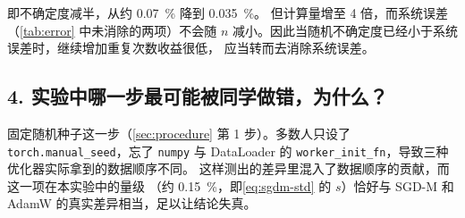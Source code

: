 即不确定度减半，从约 \qty{0.07}{\percent} 降到 \qty{0.035}{\percent}。
但计算量增至 4 倍，而系统误差（\cref{tab:error} 中未消除的两项）不会随
$n$ 减小。因此当随机不确定度已经小于系统误差时，继续增加重复次数收益很低，
应当转而去消除系统误差。

\subsection*{4. 实验中哪一步最可能被同学做错，为什么？}

固定随机种子这一步（\cref{sec:procedure} 第 1 步）。多数人只设了
\lstinline|torch.manual_seed|，忘了 \lstinline|numpy| 与 DataLoader 的
\lstinline|worker_init_fn|，导致三种优化器实际拿到的数据顺序不同。
这样测出的差异里混入了数据顺序的贡献，而这一项在本实验中的量级
（约 \qty{0.15}{\percent}，即\cref{eq:sgdm-std} 的 $s$）恰好与
SGD-M 和 AdamW 的真实差异相当，足以让结论失真。
